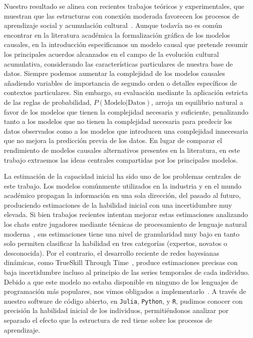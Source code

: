 \documentclass[a4paper,11pt]{book}
\theoremstyle{definition}
\begin{document}
Nuestro resultado se alinea con recientes trabajos te\'oricos y experimentales, que muestran que las estructuras con conexi\'on moderada favorecen los procesos de aprendizaje social y acumulaci\'on cultural~\cite{Derex2020}.
%
Aunque todav\'ia no es com\'un encontrar en la literatura acad\'emica la formalizaci\'on gr\'afica de los modelos causales, en la introducci\'on especificamos un modelo causal que pretende resumir los principales acuerdos alcanzados en el campo de la evoluci\'on cultural acumulativa, considerando las caracter\'isticas particulares de nuestra base de datos.
%
Siempre podemos aumentar la complejidad de los modelos causales a\~nadiendo variables de importancia de segundo orden o detalles espec\'ificos de contextos particulares.
%
Sin embargo, su evaluaci\'on mediante la aplicaci\'on estricta de las reglas de probabilidad, $P(\text{Modelo}|\text{Datos})$, arroja un equilibrio natural a favor de los modelos que tienen la complejidad necesaria y suficiente, penalizando tanto a los modelos que no tienen la complejidad necesaria para predecir los datos observados como a los modelos que introducen una complejidad innecesaria que no mejora la predicci\'on previa de los datos.
%
En lugar de comparar el rendimiento de modelos causales alternativos presentes en la literatura, en este trabajo extraemos las ideas centrales compartidas por los principales modelos.


La estimaci\'on de la capacidad inicial ha sido uno de los problemas centrales de este trabajo.
%
Los modelos com\'unmente utilizados en la industria y en el mundo acad\'emico propagan la informaci\'on en una sola direcci\'on, del pasado al futuro, produciendo estimaciones de la habilidad inicial con una incertidumbre muy elevada.
%
Si bien trabajos recientes intentan mejorar estas estimaciones analizando los chats entre jugadores mediante t\'ecnicas de procesamiento de lenguaje natural moderna~\cite{Rezapour2023}, sus estimaciones tiene una nivel de granularidad muy bajo en tanto solo permiten clasificar la habilidad en tres categor\'ias (expertos, novatos o desconocida).
%
Por el contrario, el desarrollo reciente de redes bayesianas din\'amicas, como TrueSkill Through Time~\cite{Dangauthier2007}, produce estimaciones precisas con baja incertidumbre incluso al principio de las series temporales de cada individuo.
%
Debido a que este modelo no estaba disponible en ninguno de los lenguajes de programaci\'on m\'as populares, nos vimos obligados a implementarlo~\cite{Landfried2021-TTT}.
%
A trav\'es de nuestro software de c\'odigo abierto, en \texttt{Julia}, \texttt{Python}, y \texttt{R}, pudimos conocer con precisi\'on la habilidad inicial de los individuos, permiti\'endonos analizar por separado el efecto que la estructura de red tiene sobre los procesos de aprendizaje.
\end{document}
